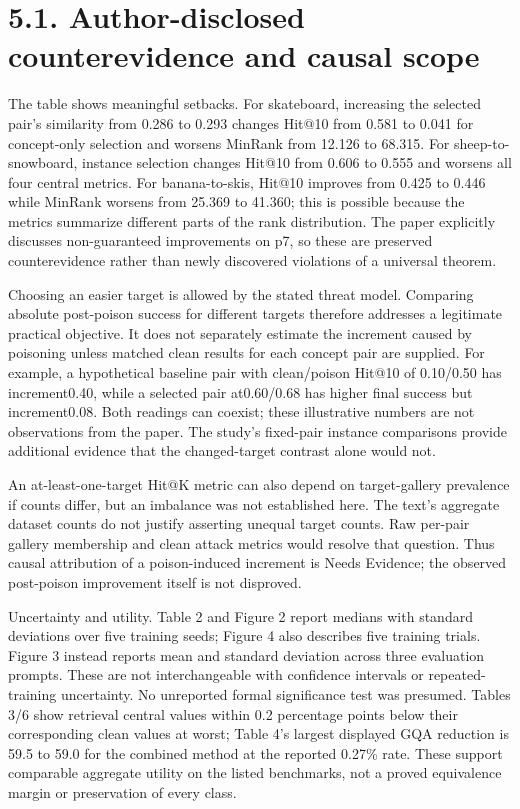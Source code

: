 \documentclass[10pt]{article}
\begin{document}
\section*{5.1. Author-disclosed counterevidence and causal scope}
The table shows meaningful setbacks. For skateboard, increasing the selected pair’s similarity from 0.286 to 0.293 changes Hit@10 from 0.581 to 0.041 for concept-only selection and worsens MinRank from 12.126 to 68.315. For sheep-to-snowboard, instance selection changes Hit@10 from 0.606 to 0.555 and worsens all four central metrics. For banana-to-skis, Hit@10 improves from 0.425 to 0.446 while MinRank worsens from 25.369 to 41.360; this is possible because the metrics summarize different parts of the rank distribution. The paper explicitly discusses non-guaranteed improvements on p7, so these are preserved counterevidence rather than newly discovered violations of a universal theorem.\par
Choosing an easier target is allowed by the stated threat model. Comparing absolute post-poison success for different targets therefore addresses a legitimate practical objective. It does not separately estimate the increment caused by poisoning unless matched clean results for each concept pair are supplied. For example, a hypothetical baseline pair with clean/poison Hit@10 of 0.10/0.50 has increment0.40, while a selected pair at0.60/0.68 has higher final success but increment0.08. Both readings can coexist; these illustrative numbers are not observations from the paper. The study’s fixed-pair instance comparisons provide additional evidence that the changed-target contrast alone would not.\par
An at-least-one-target Hit@K metric can also depend on target-gallery prevalence if counts differ, but an imbalance was not established here. The text’s aggregate dataset counts do not justify asserting unequal target counts. Raw per-pair gallery membership and clean attack metrics would resolve that question. Thus causal attribution of a poison-induced increment is Needs Evidence; the observed post-poison improvement itself is not disproved.\par
Uncertainty and utility. Table 2 and Figure 2 report medians with standard deviations over five training seeds; Figure 4 also describes five training trials. Figure 3 instead reports mean and standard deviation across three evaluation prompts. These are not interchangeable with confidence intervals or repeated-training uncertainty. No unreported formal significance test was presumed. Tables 3/6 show retrieval central values within 0.2 percentage points below their corresponding clean values at worst; Table 4’s largest displayed GQA reduction is 59.5 to 59.0 for the combined method at the reported 0.27\% rate. These support comparable aggregate utility on the listed benchmarks, not a proved equivalence margin or preservation of every class.\par
\end{document}

